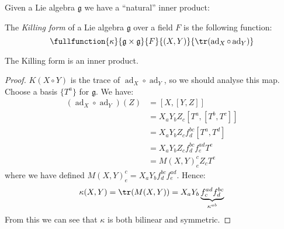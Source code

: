\documentclass{jknotes}
\begin{document}
Given a Lie algebra \(\mathfrak{g}\) we have a ``natural'' inner product:
\begin{defn}
    The \emph{Killing form} of a Lie algebra \(\mathfrak{g}\) over a field \(F\) is the following function:
    \begin{equation}
        \fullfunction{\kappa}{\mathfrak{g}\times\mathfrak{g}}{F}{(X,Y)}{\tr(\operatorname{ad}_X \circ \operatorname{ad}_Y)}
    \end{equation}
\end{defn}
\begin{lemma}
    The Killing form is an inner product.
\end{lemma}
\begin{proof}
    \(K(X\circ Y)\) is the trace of \(\operatorname{ad}_X\circ\operatorname{ad}_Y\), so we should analyse this map. Choose a basis \(\{T^a\}\) for \(\mathfrak{g}\). We have:
    \begin{align}
        (\operatorname{ad}_X\circ\operatorname{ad}_Y)(Z) &= [X,[Y,Z]] \\
        &= X_aY_bZ_c [T^a,[T^b,T^c]] \\
        &= X_aY_bZ_c f^{bc}_d[T^a,T^d] \\
        &= X_aY_bZ_c f^{bc}_df^{ad}_eT^e \\
        &= M(X,Y)^c_eZ_cT^e
    \end{align}
    where we have defined \(M(X,Y)^c_e = X_aY_bf^{bc}_df^{ad}_e\). Hence:
    \begin{equation}
        \kappa(X,Y) = \tr(M(X,Y)) = X_aY_b\underbrace{f^{ad}_cf^{bc}_d}_{\kappa^{ab}}
    \end{equation}
    From this we can see that \(\kappa\) is both bilinear and symmetric.
\end{proof}
\end{document}
